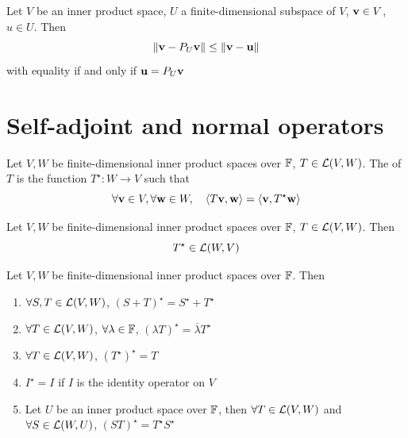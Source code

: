 \documentclass[aspectratio=169]{beamer}
\begin{document}
\begin{frame}
\begin{importanttheorem}
Let $V$ be an inner product space, $U$ a finite-dimensional subspace of $V$, $\mathbf{v}\in V$, $u\in U$. Then
\[
\|\mathbf{v}-P_U\mathbf{v}\|\leq \|\mathbf{v}-\mathbf{u}\|
\]
with equality if and only if $\mathbf{u}=P_U\mathbf{v}$
\end{importanttheorem}
\end{frame}





\section{Self-adjoint and normal operators}


\begin{frame}
\begin{definition}[Adjoint]
Let $V,W$ be finite-dimensional inner product spaces over $\mathbb{F}$, $T\in\mathcal{L}(V,W)$. The  of $T$ is the function $T^\star:W\to V$ such that
\[
\forall\mathbf{v}\in V,\forall\mathbf{w}\in W,\quad 
\langle T\mathbf{v},\mathbf{w}\rangle = \langle\mathbf{v},T^\star\mathbf{w}\rangle
\]
\end{definition}
\vfill
\begin{theorem}
Let $V,W$ be finite-dimensional inner product spaces over $\mathbb{F}$, $T\in\mathcal{L}(V,W)$. Then
\[
T^\star \in\mathcal{L}(W,V)
\]
\end{theorem}
\end{frame}

\begin{frame}
\begin{importantproperty}
Let $V,W$ be finite-dimensional inner product spaces over $\mathbb{F}$.
Then
\begin{enumerate}
\item $\forall S,T\in\mathcal{L}(V,W)$, $(S+T)^\star =S^\star +T^\star $
\item $\forall T\in\mathcal{L}(V,W)$, $\forall\lambda\in\mathbb{F}$, $(\lambda T)^\star =\overline{\lambda} T^\star $
\item $\forall T\in\mathcal{L}(V,W)$, $(T^\star )^\star =T$
\item $I^\star =I$ if $I$ is the identity operator on $V$
\item Let $U$ be an inner product space over $\mathbb{F}$, then $\forall T\in\mathcal{L}(V,W)$ and $\forall S\in\mathcal{L}(W,U)$, $(ST)^\star =T^\star S^\star $
\end{enumerate}
\end{importantproperty}
\end{frame}
\end{document}
